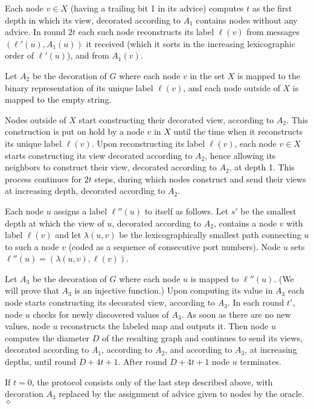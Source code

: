 \documentclass{article}
\newcommand{\procend}{\hfill $\diamond$\medskip}
\begin{document}
Each  node $v\in X$ (having a trailing bit 1 in its advice) computes $t$ as the first depth in which its view, decorated according to $A_1$ contains nodes without any advice.
In round $2t$ each such node reconstructs its label $\ell(v)$ from messages $(\ell'(u), A_1(u))$ it received (which it sorts in the increasing lexicographic order of $\ell'(u)$), and from $A_1(v)$.

Let $A_2$ be the decoration of $G$ where each node $v$ in the set $X$ is mapped to the binary representation of its unique label $\ell(v)$, and each node outside of $X$ is mapped to the empty string.

Nodes outside of $X$  start constructing their decorated view, according to $A_2$. This construction is put on hold by a node $v$ in $X$ until the time when it reconstructs its unique label $\ell(v)$.
Upon reconstructing its label $\ell(v)$, each node $v \in X$ starts constructing its view decorated according to $A_2$, hence allowing its neighbors to construct their view, decorated according to $A_2$, at depth 1.
This process continues for $2t$ steps, during which nodes construct and send their views at increasing depth, decorated according to $A_2$.

Each node $u$ assigns a label $\ell'' (u)$ to itself as follows.
Let $s'$ be the smallest depth at which the view of $u$, decorated according to $A_2$, contains a node $v$ with label $\ell(v)$ and let $\lambda(u,v)$ be the lexicographically smallest path connecting $u$ to such a node $v$ (coded as a sequence of consecutive port numbers). Node $u$ sets $\ell''(u)=(\lambda(u,v), \ell(v))$.



Let $A_3$ be the decoration of $G$ where each node $u$ is mapped to $\ell''(u)$.
(We will prove that $A_3$ is an injective function.)
Upon computing its value in $A_3$ each node starts constructing its decorated view, according to $A_3$.
In each round $t'$, node $u$ checks for newly discovered values of $A_3$.
As soon as there are no new values, node $u$ reconstructs the labeled map and outputs it.
Then node $u$ computes the diameter $D$ of the resulting graph and continues to send its views, decorated according to $A_1$, according to  $A_2$, and according to $A_3$, at increasing depths, until round $D + 4t+1$.  After round $D + 4t+1$ node $u$ terminates.

If $t=0$, the protocol consists only of the last step described above, with decoration $A_3$ replaced by the assignment of advice given to nodes by the oracle.
\procend
\end{document}

